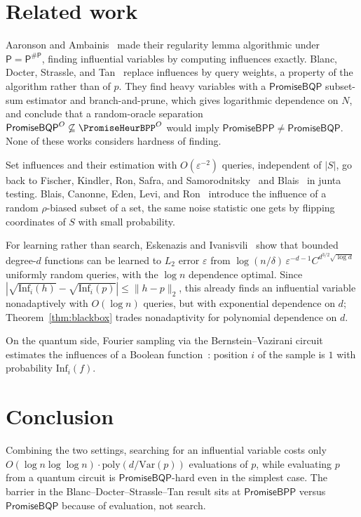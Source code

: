 \documentclass[11pt]{article}
\theoremstyle{remark}
\newcommand{\Inf}{\mathrm{Inf}}
\newcommand{\Var}{\mathrm{Var}}
\newcommand{\poly}{\mathrm{poly}}
\newcommand{\PromiseBQP}{\mathsf{PromiseBQP}}
\newcommand{\PromiseBPP}{\mathsf{PromiseBPP}}
\begin{document}
\section{Related work}

Aaronson and Ambainis~\cite{AA14} made their regularity lemma algorithmic under
$\mathsf{P}=\mathsf{P}^{\#\mathsf{P}}$, finding influential variables by computing
influences exactly. Blanc, Docter, Strassle, and Tan~\cite{BDST26} replace influences
by query weights, a property of the algorithm rather than of $p$. They find heavy
variables with a $\PromiseBQP$ subset-sum estimator and branch-and-prune, which gives
logarithmic dependence on $N$, and conclude that a random-oracle separation
$\PromiseBQP^O\not\subseteq\PromiseHeurBPP^O$ would imply
$\PromiseBPP\neq\PromiseBQP$. None of these works considers hardness of finding.

Set influences and their estimation with $O(\varepsilon^{-2})$ queries, independent
of $|S|$, go back to Fischer, Kindler, Ron, Safra, and Samorodnitsky~\cite{FKRSS04} and
Blais~\cite{Blais09} in junta testing. Blais, Canonne, Eden, Levi, and
Ron~\cite{BCELR18} introduce the influence of a random $\rho$-biased subset of a set,
the same noise statistic one gets by flipping coordinates of $S$ with small
probability.

For learning rather than search, Eskenazis and Ivanisvili~\cite{EI22} show that
bounded degree-$d$ functions can be learned to $L_2$ error $\varepsilon$ from
$\log(n/\delta)\,\varepsilon^{-d-1}C^{d^{3/2}\sqrt{\log d}}$ uniformly random
queries, with the $\log n$ dependence optimal. Since $|\sqrt{\Inf_i(h)}-\sqrt{\Inf_i(p)}|\le\|h-p\|_2$,
this already finds an influential variable nonadaptively with $O(\log n)$ queries, but
with exponential dependence on $d$; Theorem~\ref{thm:blackbox} trades nonadaptivity
for polynomial dependence on $d$.

On the quantum side, Fourier sampling via the Bernstein--Vazirani circuit estimates
the influences of a Boolean function~\cite{FAH13,LY15}: position $i$ of the sample is
$1$ with probability $\Inf_i(f)$.

\section{Conclusion}

Combining the two settings, searching for an influential variable costs only
$O(\log n\log\log n)\cdot\poly(d/\Var(p))$ evaluations of $p$, while evaluating $p$ from a
quantum circuit is $\PromiseBQP$-hard even in the simplest case. The barrier in the
Blanc--Docter--Strassle--Tan result sits at $\PromiseBPP$ versus $\PromiseBQP$ because
of evaluation, not search.
\end{document}
